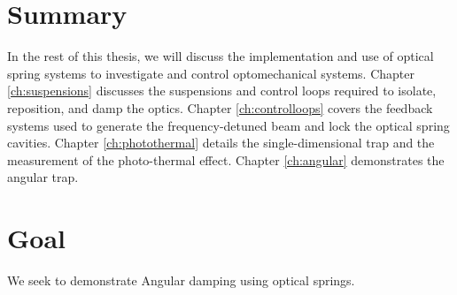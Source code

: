 \section{Summary}
In the rest of this thesis, we will discuss the implementation and use of optical spring systems to investigate and control optomechanical systems. Chapter \ref{ch:suspensions} discusses the suspensions and control loops required to isolate, reposition, and damp the optics. Chapter \ref{ch:controlloops} covers the feedback systems used to generate the frequency-detuned beam and lock the optical spring cavities. Chapter \ref{ch:photothermal} details the single-dimensional trap and the measurement of the photo-thermal effect. Chapter \ref{ch:angular} demonstrates the angular trap. 

\section{Goal}
We seek to demonstrate Angular damping using optical springs.